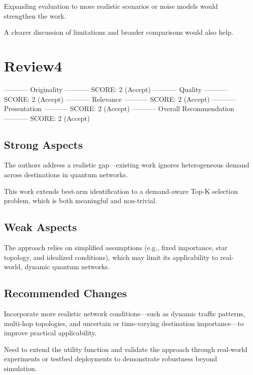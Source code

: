\documentclass[conference,15pt]{IEEEtran}
\begin{document}
Expanding evaluation to more realistic scenarios or noise models would
strengthen the work.

A clearer discussion of limitations and broader comparisons would also
help.


\section*{Review4}
\label{sec:org52a2b95}
----------- Originality -----------
SCORE: 2 (Accept)
----------- Quality -----------
SCORE: 2 (Accept)
----------- Relevance -----------
SCORE: 2 (Accept)
----------- Presentation -----------
SCORE: 2 (Accept)
----------- Overall Recommendation -----------
SCORE: 2 (Accept)


\subsection*{Strong Aspects}
\label{sec:org9f672ad}
The authors address a realistic gap—existing work ignores
heterogeneous demand across destinations in quantum networks.

This work extends best-arm identification to a demand-aware Top-K
selection problem, which is both meaningful and non-trivial.

\subsection*{Weak Aspects}
\label{sec:org640d1a8}
The approach relies on simplified assumptions (e.g., fixed importance,
star topology, and idealized conditions), which may limit its
applicability to real-world, dynamic quantum networks.


\subsection*{Recommended Changes}
\label{sec:orgc00ac21}
Incorporate more realistic network conditions—such as dynamic traffic
patterns, multi-hop topologies, and uncertain or time-varying
destination importance—to improve practical applicability.

Need to extend the utility function and validate the approach through
real-world experiments or testbed deployments to demonstrate
robustness beyond simulation.
\end{document}
